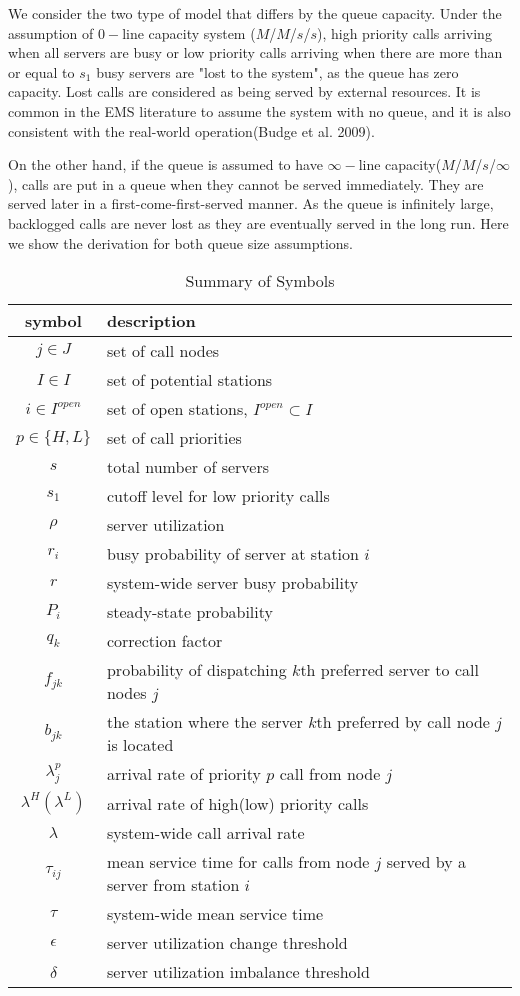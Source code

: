 \documentclass{article}
\begin{document}
We consider the two type of model that differs by the queue capacity. Under the assumption of $0-$line capacity system ($M$/$M$/$s$/$s$), high priority calls arriving when all servers are busy or low priority calls arriving when there are more than or equal to $s_1$ busy servers are "lost to the system", as the queue has zero capacity. Lost calls are considered as being served by external resources. It is common in the EMS literature to assume the system with no queue, and it is also  consistent with the real-world operation(Budge et al. 2009). 

On the other hand, if the queue is assumed to have $\infty-$line capacity($M$/$M$/$s$/$\infty$), calls are put in a queue when they cannot be served immediately. They are served later in a first-come-first-served manner. As the queue is infinitely large, backlogged calls are never lost as they are eventually served in the long run. Here we show the derivation for both queue size assumptions.


\begin{table}
\centering
\begin{tabular}{c l}
\hline
\hline
\textbf{symbol} & \textbf{description} \\
\hline
 $j \in J$	& set of call nodes \\
 $I \in I$ & set of potential stations\\
 $i \in I^{open}$ & set of open stations, $I^{open} \subset I$ \\
 $p \in \{H,L\}$ & set of call priorities \\
 $ s $ 	& total number of servers \\
 $ s_1 $& cutoff level for low priority calls\\
 $\rho$ & server utilization \\
 $ r_i$ & busy probability of server at station $i$ \\
 $ r $ 	& system-wide server busy probability \\
 $P_i$ 	& steady-state probability \\
 $q_k$ 	& correction factor \\
 $f_{jk}$ & probability of dispatching $k$th preferred server to call nodes $j$ \\
 $b_{jk}$ & the station where the server $k$th preferred by call node $j$ is located \\
 $\lambda_{j}^p$ & arrival rate of priority $p$ call from node $j$\\
 $\lambda^H(\lambda^L)$ & arrival rate of high(low) priority calls\\
 $\lambda$ & system-wide call arrival rate\\
 $\tau_{ij}$ & mean service time for calls from node $j$ served by a server from station $i$ \\
 $\tau$ & system-wide mean service time\\
 $\epsilon$ & server utilization change threshold\\
 $\delta$ & server utilization imbalance threshold\\
\hline
\end{tabular}
\caption{Summary of Symbols}
\label{table:symbol}
\end{table}
\end{document}
